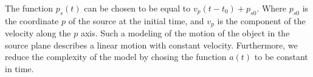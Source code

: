 The function $p_s(t)$ can be chosen to be equal to $v_p(t-t_0) + p_{s0}$. Where $p_{s0}$ is the coordinate $p$ of the source at the initial time, and $v_p$ is the component of the velocity
along the $p$ axis. Such a modeling of the motion of the object in the source plane describes a linear motion with constant velocity. Furthermore, we reduce the complexity of the model by 
chosing the function $a(t)$ to be constant in time.  


